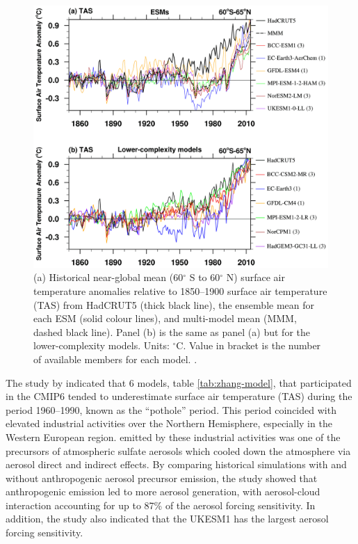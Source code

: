 \begin{figure}
    \centering
    \includegraphics[width=6in]{Chapter1/figs/pothole_figure_Zhang2021.png}
    \caption[Anomalous cooling in the Earth system models participating in CMIP6]{(a) Historical near-global mean (60$^\circ$ S to 60$^\circ$ N) surface air temperature anomalies relative to 1850--1900 surface air temperature (TAS) from HadCRUT5 (thick black line), the ensemble mean for each ESM (solid colour lines), and multi-model mean (MMM, dashed black line). Panel (b) is the same as panel (a) but for the lower-complexity models. Units: $^\circ$C. Value in bracket is the number of available members for each model. \citep{zhangRoleAnthropogenicAerosols2021}.}
    \label{fig:zhang-pothole}
\end{figure}

The study by \citet{zhangRoleAnthropogenicAerosols2021} indicated that 6 models, table \ref{tab:zhang-model}, that participated in the CMIP6 tended to underestimate surface air temperature (TAS) during the period 1960--1990, known as the “pothole” period. This period coincided with elevated industrial activities over the Northern Hemisphere, especially in the Western European region.  emitted by these industrial activities was one of the precursors of atmospheric sulfate aerosols which cooled down the atmosphere via aerosol direct and indirect effects. By comparing historical simulations with and without anthropogenic aerosol precursor emission, the study showed that anthropogenic emission led to more aerosol generation, with aerosol-cloud interaction accounting for up to 87\% of the aerosol forcing sensitivity. In addition, the study also indicated that the UKESM1 has the largest aerosol forcing sensitivity. 

